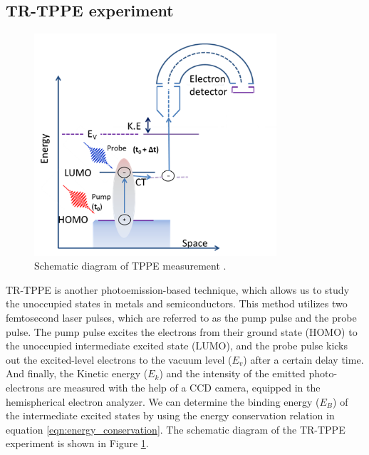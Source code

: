 \documentclass[12pt]{article}
\begin{document}
\subsection{TR-TPPE experiment}
\begin{figure}[H]
    \centering
    \includegraphics[width = 9cm]{TPPE scheme TIKA.png}
    \caption{Schematic diagram of TPPE measurement \cite{kafle2019role}.}
    \label{fig:TPPE scheme}
\end{figure}
TR-TPPE is another photoemission-based technique, which allows us to study the unoccupied states in metals and semiconductors. This method utilizes two femtosecond laser pulses, which are referred to as the pump pulse and the probe pulse. The pump pulse excites the electrons from their ground state (HOMO) to the unoccupied intermediate excited state (LUMO), and the probe pulse kicks out the excited-level electrons to the vacuum level ($E_v$) after a certain delay time. And finally, the Kinetic energy ($E_k$) and the intensity of the emitted photo-electrons are measured with the help of a CCD camera, equipped in the hemispherical electron analyzer. We can determine the binding energy ($E_B$) of the intermediate excited states by using the energy conservation relation in equation \ref{eqn:energy_conservation}. The schematic diagram of the TR-TPPE experiment is shown in Figure \ref{fig:TPPE scheme}.
\end{document}
